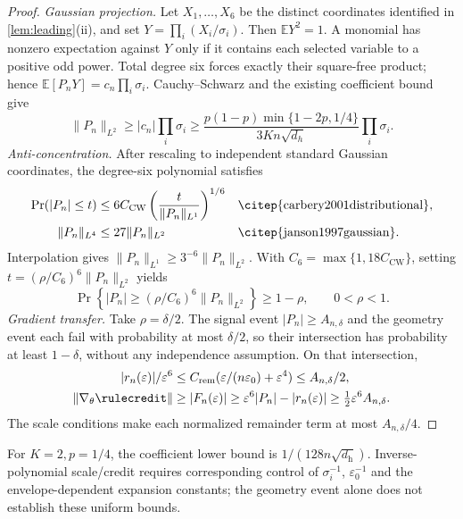 \begin{proof}
\emph{Gaussian projection.} Let $X_1,\ldots,X_6$ be the distinct coordinates
identified in \cref{lem:leading}(ii), and set $Y=\prod_i(X_i/\sigma_i)$.
Then $\mathbb E Y^2=1$. A monomial has nonzero expectation against $Y$
only if it contains each selected variable to a positive odd power.
Total degree six forces exactly their square-free product; hence
$\mathbb E[P_nY]=c_n\prod_i\sigma_i$. Cauchy--Schwarz and the existing coefficient bound give
\begin{equation}\label{eq:quant-rule-L2}
 \|P_n\|_{L^2}\ge |c_n|\prod_i\sigma_i
 \ge\frac{p(1-p)\min\{1-2p,1/4\}}{3Kn\sqrt{d_h}}\prod_i\sigma_i.
\end{equation}
\emph{Anti-concentration.} After rescaling to independent standard Gaussian
coordinates, the degree-six polynomial satisfies
\begin{align*}
 \Pr(|P_n|\le t)&\le6C_{\mathrm{CW}}
 \left(\frac{t}{\|P_n\|_{L^1}}\right)^{1/6}
 &&\text{\citep{carbery2001distributional}},\\
 \|P_n\|_{L^4}&\le27\|P_n\|_{L^2}
 &&\text{\citep{janson1997gaussian}}.
\end{align*}
Interpolation gives $\|P_n\|_{L^1}\ge3^{-6}\|P_n\|_{L^2}$.
With $C_6=\max\{1,18C_{\mathrm{CW}}\}$, setting
$t=(\rho/C_6)^6\|P_n\|_{L^2}$ yields
\begin{equation}\label{eq:quant-rule-AC}
 \Pr\!\left\{|P_n|\ge(\rho/C_6)^6\|P_n\|_{L^2}\right\}\ge1-\rho,
 \qquad 0<\rho<1.
\end{equation}
\emph{Gradient transfer.} Take $\rho=\delta/2$. The signal event
$|P_n|\ge A_{n,\delta}$ and the geometry event each fail with probability
at most $\delta/2$, so their intersection has probability at least
$1-\delta$, without any independence assumption. On that intersection,
\begin{align*}
 |r_n(\varepsilon)|/\varepsilon^6
 &\le C_{\mathrm{rem}}(\varepsilon/(n\varepsilon_0)+\varepsilon^4)
 \le A_{n,\delta}/2,\\
 \|\nabla_\theta\rulecredit\|
 &\ge |F_n(\varepsilon)|\ge\varepsilon^6|P_n|-|r_n(\varepsilon)|
 \ge\tfrac12\varepsilon^6 A_{n,\delta}.
\end{align*}
The scale conditions make each normalized remainder term at most
$A_{n,\delta}/4$.
\end{proof}



For $K=2,p=1/4$, the coefficient lower bound is $1/(128n\sqrt{d_{\mathrm h}})$. Inverse-polynomial scale/credit
requires corresponding control of $\sigma_i^{-1}$, $\varepsilon_0^{-1}$
and the envelope-dependent expansion constants; the geometry event alone
does not establish these uniform bounds.

